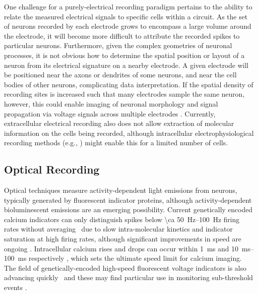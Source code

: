 One challenge for a purely-electrical recording paradigm pertains to the ability to relate the measured electrical signals to specific cells within a circuit.
As the set of neurons recorded by each electrode grows to encompass a large volume around the electrode, it will become more difficult to attribute the recorded spikes to particular neurons.
Furthermore, given the complex geometries of neuronal processes, it is not obvious how to determine the spatial position or layout of a neuron from its electrical signature on a nearby electrode. A given electrode will be positioned near the axons or dendrites of some neurons, and near the cell bodies of other neurons, complicating data interpretation. If the spatial density of recording sites is increased such that many electrodes sample the same neuron, however, this could enable imaging of neuronal morphology and signal propagation via voltage signals across multiple electrodes \cite{bakkum2013tracking}. Currently, extracellular electrical recording also does not allow extraction of molecular information on the cells being recorded, although intracellular electrophysiological recording methods (e.g., \cite{Kodandaramaiah2012}) might enable this for a limited number of cells.

\subsection{Optical Recording}

Optical techniques measure activity-dependent light emissions from neurons, typically generated by fluorescent indicator proteins, although activity-dependent bioluminescent emissions are an emerging possibility.
Current genetically encoded calcium indicators can only distinguish spikes below \SIrange{\ca 50}{100}{\hertz} firing rates without averaging~\cite{Smetters99} due to slow intra-molecular kinetics and indicator saturation at high firing rates, although significant improvements in speed are ongoing \cite{sun2013fast}. Intracellular calcium rises and drops can occur within \SI{1}{\milli\second} and \SIrange{10}{100}{\milli\second} respectively \cite{higley2008calcium}, which sets the ultimate speed limit for calcium imaging. The field of genetically-encoded high-speed fluorescent voltage indicators is also advancing quickly~\cite{Barnett2012, Kralj2012,gong2013enhanced, Storace2013, cao2013genetically, akemann2013two} and these may find particular use in monitoring sub-threshold events \cite{scanziani2009electrophysiology}.

